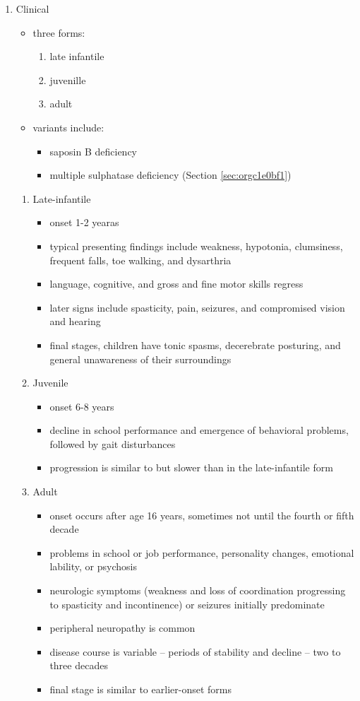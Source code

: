 \documentclass{scrartcl}
\begin{document}
\begin{enumerate}
\item Clinical
\label{sec:orgfc4c504}
\begin{itemize}
\item three forms:
\begin{enumerate}
\item late infantile
\item juvenille
\item adult
\end{enumerate}
\item variants include:
\begin{itemize}
\item saposin B deficiency
\item multiple sulphatase deficiency (Section \ref{sec:orgc1e0bf1})
\end{itemize}
\end{itemize}
\begin{enumerate}
\item Late-infantile
\label{sec:org999fccc}
\begin{itemize}
\item onset 1-2 yearas
\item typical presenting findings include weakness, hypotonia, clumsiness, frequent falls, toe walking, and dysarthria
\item language, cognitive, and gross and fine motor skills regress
\item later signs include spasticity, pain, seizures, and compromised vision and hearing
\item final stages, children have tonic spasms, decerebrate posturing, and
general unawareness of their surroundings
\end{itemize}

\item Juvenile
\label{sec:org1b2d6bb}
\begin{itemize}
\item onset 6-8 years
\item decline in school performance and emergence of behavioral problems, followed by gait disturbances
\item progression is similar to but slower than in the late-infantile form
\end{itemize}

\item Adult
\label{sec:org415c459}
\begin{itemize}
\item onset occurs after age 16 years, sometimes not until the fourth or fifth decade
\item problems in school or job performance, personality changes, emotional lability, or psychosis
\item neurologic symptoms (weakness and loss of coordination progressing
to spasticity and incontinence) or seizures initially
predominate
\item peripheral neuropathy is common
\item disease course is variable – periods of stability and decline – two to three decades
\item final stage is similar to earlier-onset forms
\end{itemize}
\end{enumerate}


\end{enumerate}
\end{document}
